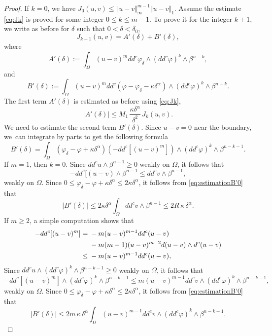 \documentclass[JEP,XML,SOM,Unicode]{cedram}
\theoremstyle{definition}
\begin{document}
\begin{proof}
If $k = 0$, we have $J_0 (u,v) \leq \Vert u - v\Vert_{\infty}^{m - 1} \Vert u - v\Vert_1$. Assume the estimate \eqref{eq:Jk} is proved for some integer $0 \leq k \leq m-1$. To prove it for the integer $k + 1$, we write as before for $\delta$ such that $0 < \delta < \delta_0$,
\[
J_{k+1} (u,v) = A' (\delta) + B' (\delta),
\]
where
\[
A' (\delta):=\int_{\Omega}(u-v)^m dd^c \varphi_{\delta}\wedge(dd^c\varphi)^{k} \wedge\beta^{n-k},
\]
and
\[
B' (\delta):= \int_{\Omega}(u-v)^m dd^c(\varphi - \varphi_{\delta} - \kappa \delta^\alpha)\wedge(dd^c\varphi)^{k} \wedge\beta^{n-k}.
\]
The first term $A' (\delta)$ is estimated as before using \eqref{eq:Jk}, \ie
\begin{equation} \label{eq:estimationA'}
|A' (\delta)|\leq M_1 \,\frac{\kappa \delta^{\alpha}}{\delta^2}\, J_k (u,v).
\end{equation}
We need to estimate the second term $B' (\delta)$. Since $ u - v = 0$ near the boundary, we~can integrate by parts to get the following formula
\begin{equation} \label{eq:estimationB'0}
B' (\delta) = \int_{\Omega} (\varphi_{\delta} - \varphi + \kappa \delta^\alpha) \left(- dd^c[ (u-v)^m]\right) \wedge (dd^c\varphi)^k\wedge\beta^{n-k-1}.
\end{equation}
If $m = 1$, then $k = 0$. Since $dd^c u \wedge \beta^{n-1} \geq 0$ weakly on $\Omega$, it follows that
\[
- dd^c [(u-v) \wedge \beta^{n-1} \leq dd^c v \wedge \beta^{n-1},
\]
weakly on $\Omega$.
Since $0 \leq \varphi_{\delta} - \varphi + \kappa \delta^\alpha \leq 2 \kappa \delta^\alpha$, it follows from \eqref{eq:estimationB'0} that
\begin{equation*} \label{eq:estimateB'1}
\vert B' (\delta) \vert \leq 2 \kappa \delta^\alpha \int_\Omega dd^c v \wedge\beta^{n-1} \leq 2 R \, \kappa \, \delta^\alpha.
\end{equation*}
If $ m \geq 2$, a simple computation shows that
\begin{align*}
- dd^c [(u-v)^m] & ={} - m (u-v)^{m -1} dd^c (u - v) \\
&\hphantom{{}={}}- m (m-1) (u-v)^{m - 2} d(u-v) \wedge d^c(u-v) \\
&\leq{}  - m (u-v)^{m -1} dd^c (u- v),
\end{align*}
Since $ dd^c u \wedge (dd^c\varphi)^k\wedge\beta^{n-k-1} \geq 0$ weakly on $\Omega$, it follows that
\[
- dd^c [(u-v)^m] \wedge (dd^c\varphi)^k\wedge\beta^{n-k-1} \leq m (u-v)^{m -1} dd^c v\wedge (dd^c\varphi)^k\wedge\beta^{n-k-1},
\]
weakly on $\Omega$.
Since $0 \leq \varphi_{\delta} - \varphi + \kappa \delta^\alpha \leq 2 \kappa \delta^\alpha$, it follows from \eqref{eq:estimationB'0} that
\begin{equation} \label{eq:estimation2}
|B' (\delta)| \leq 2 m \, \kappa \, \delta^{\alpha} \int_\Omega (u-v)^{m -1} dd^c v \wedge (dd^c\varphi)^k\wedge\beta^{n-k-1}.
\end{equation}


\end{proof}
\end{document}
